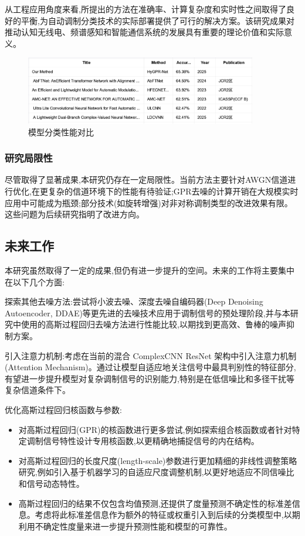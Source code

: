 \documentclass{article}
\begin{document}
\begin{CJK}{UTF8}{gbsn}
从工程应用角度来看,所提出的方法在准确率、计算复杂度和实时性之间取得了良好的平衡,为自动调制分类技术的实际部署提供了可行的解决方案。该研究成果对推动认知无线电、频谱感知和智能通信系统的发展具有重要的理论价值和实际意义。

\begin{figure}[H]
    \centering
    \includegraphics[width=0.9\textwidth]{figure/image21.png}
    \caption{模型分类性能对比}
    \label{fig:model_performance_comparison}
\end{figure}

\subsubsection{研究局限性}
尽管取得了显著成果,本研究仍存在一定局限性。当前方法主要针对AWGN信道进行优化,在更复杂的信道环境下的性能有待验证;GPR去噪的计算开销在大规模实时应用中可能成为瓶颈;部分技术(如旋转增强)对非对称调制类型的改进效果有限。这些问题为后续研究指明了改进方向。

\subsection{未来工作}
本研究虽然取得了一定的成果,但仍有进一步提升的空间。未来的工作将主要集中在以下几个方面:

探索其他去噪方法:尝试将小波去噪、深度去噪自编码器(Deep Denoising Autoencoder, DDAE)等更先进的去噪技术应用于调制信号的预处理阶段,并与本研究中使用的高斯过程回归去噪方法进行性能比较,以期找到更高效、鲁棒的噪声抑制方案。

引入注意力机制:考虑在当前的混合 ComplexCNN ResNet 架构中引入注意力机制(Attention Mechanism)。通过让模型自适应地关注信号中最具判别性的特征部分,有望进一步提升模型对复杂调制信号的识别能力,特别是在低信噪比和多径干扰等复杂信道条件下。

优化高斯过程回归核函数与参数:
\begin{itemize}
    \item 对高斯过程回归(GPR)的核函数进行更多尝试,例如探索组合核函数或者针对特定调制信号特性设计专用核函数,以更精确地捕捉信号的内在结构。
    \item 对高斯过程回归的长度尺度(length-scale)参数进行更加精细的非线性调整策略研究,例如引入基于机器学习的自适应尺度调整机制,以更好地适应不同信噪比和信号动态特性。
    \item 高斯过程回归的结果不仅包含均值预测,还提供了度量预测不确定性的标准差信息。考虑将此标准差信息作为额外的特征或权重引入到后续的分类模型中,以期利用不确定性度量来进一步提升预测性能和模型的可靠性。
\end{itemize}


\end{CJK}
\end{document}
